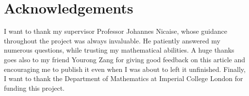 \documentclass[12pt]{article}
\begin{document}
\vspace{5em}
\section*{Acknowledgements}
I want to thank my supervisor Professor Johannes Nicaise, whose guidance throughout
the project was always invaluable. He patiently answered my numerous questions, while
trusting my mathematical abilities. A huge thanks goes also to my friend
Yourong Zang for giving good feedback on this article and encouraging me
to publish it even when I was about to left it unfinished. Finally,
I want to thank the Department of Mathematics at Imperial College London
for funding this project.









\end{document}
